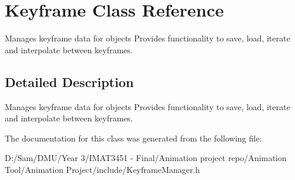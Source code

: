\hypertarget{class_keyframe}{}\section{Keyframe Class Reference}
\label{class_keyframe}


Manages keyframe data for objects Provides functionality to save, load, iterate and interpolate between keyframes.  




\subsection{Detailed Description}
Manages keyframe data for objects Provides functionality to save, load, iterate and interpolate between keyframes. 

The documentation for this class was generated from the following file\+:\begin{DoxyCompactItemize}
\item 
D\+:/\+Sam/\+D\+M\+U/\+Year 3/\+I\+M\+A\+T3451 -\/ Final/\+Animation project repo/\+Animation Tool/\+Animation Project/include/Keyframe\+Manager.\+h\end{DoxyCompactItemize}
